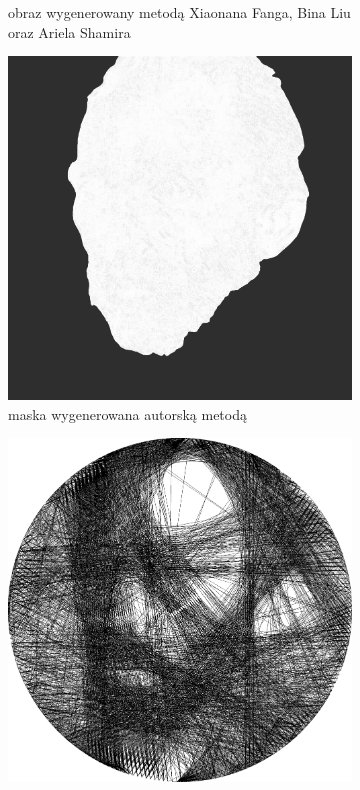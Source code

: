 \begin{figure}[H]
\begin{subfigure}{0.24\textwidth}
        \caption{obraz wygenerowany metodą Xiaonana Fanga, Bina Liu oraz Ariela Shamira}
        \label{comp-comp-dufu-gogh-f}
    \end{subfigure}
    \begin{subfigure}{0.24\textwidth}
        \centering
        \includegraphics[width = \textwidth]{img/6-comp/gogh_mask_c20_inv0_bg10_obj1_ed1.png}
        \caption{maska wygenerowana autorską metodą}
        \label{comp-comp-dufu-gogh-g}
    \end{subfigure}
    \begin{subfigure}{0.24\textwidth}
        \centering
        \includegraphics[width = \textwidth]{img/6-comp/gogh_e_i2000_c20_inv0_bg10_obj1_ed1.png}

\end{subfigure}
\end{figure}
